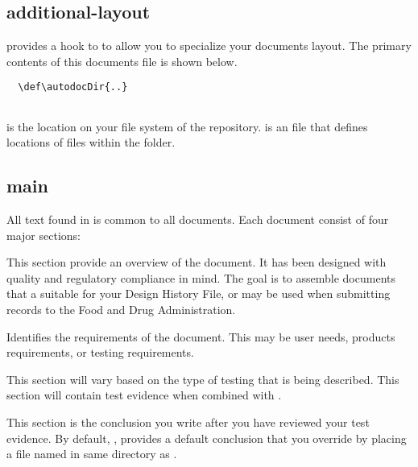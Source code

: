 \subsection{additional-layout}
\skTlcArticle provides a hook to \skAdditionalLayout to allow you to specialize
your documents layout.  The primary contents of this documents
\skAdditionalLayout file is shown below.

\begin{verbatim}
  \def\autodocDir{..}
  
\end{verbatim}

\skAutoDocDir is the location on your file system of the \skAutoDoc repository.
\skProjectDirTex is an \skAutoDoc file that defines locations of files within
the \skAutoDoc folder.

\subsection{main}
All text found in \skBoilerplate is common to all \skAutoDoc documents.  Each
document consist of four major sections:

\begin{description}[leftmargin=3cm, style=nextline]
  \item[Overview:] This section provide an overview of the document.  It has
    been designed with quality and regulatory compliance in mind.  The goal is
    to assemble documents that a suitable for your Design History File, or may
    be used when submitting records to the Food and Drug Administration.

  \item[Requirements:] Identifies the requirements of the document.  This may be
    user needs, products requirements, or testing requirements.

  \item[Test Plan Overview:] This section will vary based on the type of testing
    that is being described.  This section will contain test evidence when
    combined with \skAmber.

  \item[Conclusion:] This section is the conclusion you write after you have
    reviewed your test evidence.  By default, \skAutoDoc, provides a default
    conclusion that you override by placing a file named \skConclusion in same
    directory as \skStarterkit.

\end{description}


